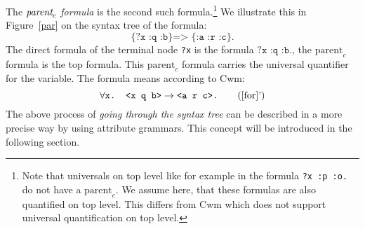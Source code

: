 The $\emph{parent}_c$ \emph{formula} is the second such formula.\footnote{Note that universals on top level like for example in the formula \texttt{?x :p :o.} 
do not have a $\text{parent}_c$. 
We assume here, that these formulas are also quantified on top level. This differs from Cwm which does not support universal quantification on top level.}
%
%
%
We illustrate this in Figure~\ref{par} on the syntax tree of the formula:
\begin{equation}
 \texttt{\{?x :q :b\} => \{:a :r :c\}.}\label{for}
\end{equation}
The direct formula of the terminal node \texttt{?x} is the formula $\texttt{?x :q :b.}$, the
$\text{parent}_c$ formula is the 
top formula. This $\text{parent}_c$ formula carries the universal quantifier for the variable.
 The formula means according to Cwm:
\begin{equation}
\forall \texttt{x. <x q b>}\rightarrow  \texttt{<a r c>.}
 \tag{\ref{for}'}
\end{equation}
The above process of \emph{going through the syntax tree} can be described in a more precise way by using 
attribute grammars. %
This concept will be introduced in the following section.


